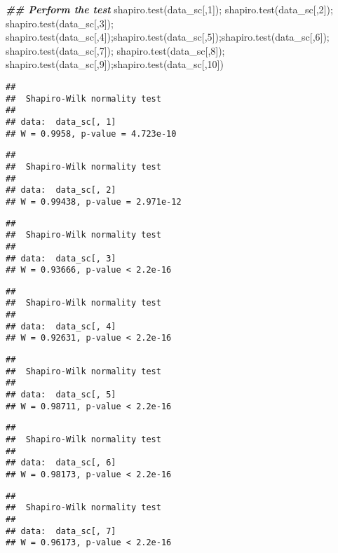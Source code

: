\documentclass[
]{article}
\newenvironment{Shaded}{\begin{snugshade}}{\end{snugshade}}
\newcommand{\DecValTok}[1]{\textcolor[rgb]{0.00,0.00,0.81}{#1}}
\newcommand{\DocumentationTok}[1]{\textcolor[rgb]{0.56,0.35,0.01}{\textbf{\textit{#1}}}}
\newcommand{\FunctionTok}[1]{\textcolor[rgb]{0.00,0.00,0.00}{#1}}
\newcommand{\NormalTok}[1]{#1}
\begin{document}
\begin{Shaded}
\begin{Highlighting}[]
\DocumentationTok{\#\# Perform the test}
\FunctionTok{shapiro.test}\NormalTok{(data\_sc[,}\DecValTok{1}\NormalTok{]); }\FunctionTok{shapiro.test}\NormalTok{(data\_sc[,}\DecValTok{2}\NormalTok{]); }\FunctionTok{shapiro.test}\NormalTok{(data\_sc[,}\DecValTok{3}\NormalTok{]); }\FunctionTok{shapiro.test}\NormalTok{(data\_sc[,}\DecValTok{4}\NormalTok{]);}\FunctionTok{shapiro.test}\NormalTok{(data\_sc[,}\DecValTok{5}\NormalTok{]);}\FunctionTok{shapiro.test}\NormalTok{(data\_sc[,}\DecValTok{6}\NormalTok{]); }\FunctionTok{shapiro.test}\NormalTok{(data\_sc[,}\DecValTok{7}\NormalTok{]); }\FunctionTok{shapiro.test}\NormalTok{(data\_sc[,}\DecValTok{8}\NormalTok{]); }\FunctionTok{shapiro.test}\NormalTok{(data\_sc[,}\DecValTok{9}\NormalTok{]);}\FunctionTok{shapiro.test}\NormalTok{(data\_sc[,}\DecValTok{10}\NormalTok{])}
\end{Highlighting}
\end{Shaded}

\begin{verbatim}
## 
##  Shapiro-Wilk normality test
## 
## data:  data_sc[, 1]
## W = 0.9958, p-value = 4.723e-10
\end{verbatim}

\begin{verbatim}
## 
##  Shapiro-Wilk normality test
## 
## data:  data_sc[, 2]
## W = 0.99438, p-value = 2.971e-12
\end{verbatim}

\begin{verbatim}
## 
##  Shapiro-Wilk normality test
## 
## data:  data_sc[, 3]
## W = 0.93666, p-value < 2.2e-16
\end{verbatim}

\begin{verbatim}
## 
##  Shapiro-Wilk normality test
## 
## data:  data_sc[, 4]
## W = 0.92631, p-value < 2.2e-16
\end{verbatim}

\begin{verbatim}
## 
##  Shapiro-Wilk normality test
## 
## data:  data_sc[, 5]
## W = 0.98711, p-value < 2.2e-16
\end{verbatim}

\begin{verbatim}
## 
##  Shapiro-Wilk normality test
## 
## data:  data_sc[, 6]
## W = 0.98173, p-value < 2.2e-16
\end{verbatim}

\begin{verbatim}
## 
##  Shapiro-Wilk normality test
## 
## data:  data_sc[, 7]
## W = 0.96173, p-value < 2.2e-16
\end{verbatim}
\end{document}
